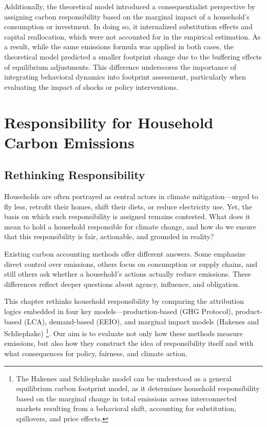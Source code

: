 \documentclass[12pt,a4paper]{article}%
\begin{document}
Additionally, the theoretical model introduced a consequentialist perspective by assigning carbon responsibility based on the marginal impact of a household's consumption or investment. In doing so, it internalized substitution effects and capital reallocation, which were not accounted for in the empirical estimation. As a result, while the same emissions formula was applied in both cases, the theoretical model predicted a smaller footprint change due to the buffering effects of equilibrium adjustments. This difference underscores the importance of integrating behavioral dynamics into footprint assessment, particularly when evaluating the impact of shocks or policy interventions.


\section{Responsibility for Household Carbon Emissions}
\subsection{Rethinking Responsibility}

Households are often portrayed as central actors in climate mitigation—urged to fly less, retrofit their homes, shift their diets, or reduce electricity use. Yet, the basis on which such responsibility is assigned remains contested. What does it mean to hold a household responsible for climate change, and how do we ensure that this responsibility is fair, actionable, and grounded in reality?

Existing carbon accounting methods offer different answers. Some emphasize direct control over emissions, others focus on consumption or supply chains, and still others ask whether a household’s actions actually reduce emissions. These differences reflect deeper questions about agency, influence, and obligation. 

This chapter rethinks household responsibility by comparing the attribution logics embedded in four key models—production-based (GHG Protocol), product-based (LCA), demand-based (EEIO), and marginal impact models (Hakenes and Schliephake) \footnote{The Hakenes and Schliephake model can be understood as a general equilibrium carbon footprint model, as it determines household responsibility based on the marginal change in total emissions across interconnected markets resulting from a behavioral shift, accounting for substitution, spillovers, and price effects.}. Our aim is to evaluate not only how these methods measure emissions, but also how they construct the idea of responsibility itself and with what consequences for policy, fairness, and climate action.
\end{document}
